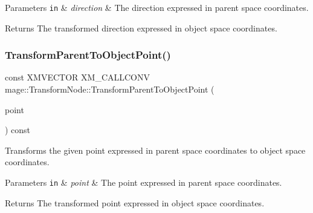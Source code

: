 \begin{DoxyParams}[1]{Parameters}
\mbox{\tt in}  & {\em direction} & The direction expressed in parent space coordinates. \\
\hline
\end{DoxyParams}
\begin{DoxyReturn}{Returns}
The transformed direction expressed in object space coordinates. 
\end{DoxyReturn}
\hypertarget{structmage_1_1_transform_node_afb966684b63c5e24845fa93a53802b5f}{}\label{structmage_1_1_transform_node_afb966684b63c5e24845fa93a53802b5f} 
\subsubsection{\texorpdfstring{Transform\+Parent\+To\+Object\+Point()}{TransformParentToObjectPoint()}}
{\footnotesize\ttfamily const X\+M\+V\+E\+C\+T\+OR X\+M\+\_\+\+C\+A\+L\+L\+C\+O\+NV mage\+::\+Transform\+Node\+::\+Transform\+Parent\+To\+Object\+Point (\begin{DoxyParamCaption}\item[{F\+X\+M\+V\+E\+C\+T\+OR}]{point }\end{DoxyParamCaption}) const\hspace{0.3cm}{\ttfamily [noexcept]}}

Transforms the given point expressed in parent space coordinates to object space coordinates.


\begin{DoxyParams}[1]{Parameters}
\mbox{\tt in}  & {\em point} & The point expressed in parent space coordinates. \\
\hline
\end{DoxyParams}
\begin{DoxyReturn}{Returns}
The transformed point expressed in object space coordinates. 
\end{DoxyReturn}
\hypertarget{structmage_1_1_transform_node_a20d7ef8d49095a4ffddf508cad7d89d1}{}\label{structmage_1_1_transform_node_a20d7ef8d49095a4ffddf508cad7d89d1} 

